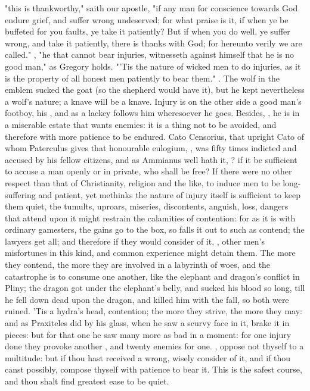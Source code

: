 {"this is thankworthy," saith our apostle, "if any man for conscience towards God endure grief, and suffer wrong undeserved; for what praise is it, if when ye be buffeted for you faults, ye take it patiently? But if when you do well, ye suffer wrong, and take it patiently, there is thanks with God; for hereunto verily we are called." , "he that cannot bear injuries, witnesseth against himself that he is no good man," as Gregory holds. "'Tis the nature of wicked men to do injuries, as it is the property of all honest men patiently to bear them." . The wolf in the emblem sucked the goat (so the shepherd would have it), but he kept nevertheless a wolf's nature; a knave will be a knave. Injury is on the other side a good man's footboy, his , and as a lackey follows him wheresoever he goes. Besides, , he is in a miserable estate that wants enemies: it is a thing not to be avoided, and therefore with more patience to be endured. Cato Censorius, that upright Cato of whom Paterculus gives that honourable eulogium, , was fifty times indicted and accused by his fellow citizens, and as Ammianus well hath it, ? if it be sufficient to accuse a man openly or in private, who shall be free? If there were no other respect than that of Christianity, religion and the like, to induce men to be long-suffering and patient, yet methinks the nature of injury itself is sufficient to keep them quiet, the tumults, uproars, miseries, discontents, anguish, loss, dangers that attend upon it might restrain the calamities of contention: for as it is with ordinary gamesters, the gains go to the box, so falls it out to such as contend; the lawyers get all; and therefore if they would consider of it, , other men's misfortunes in this kind, and common experience might detain them. The more they contend, the more they are involved in a labyrinth of woes, and the catastrophe is to consume one another, like the elephant and dragon's conflict in Pliny; the dragon got under the elephant's belly, and sucked his blood so long, till he fell down dead upon the dragon, and killed him with the fall, so both were ruined. 'Tis a hydra's head, contention; the more they strive, the more they may: and as Praxiteles did by his glass, when he saw a scurvy face in it, brake it in pieces: but for that one he saw many more as bad in a moment: for one injury done they provoke another , and twenty enemies for one. , oppose not thyself to a multitude: but if thou hast received a wrong, wisely consider of it, and if thou canst possibly, compose thyself with patience to bear it. This is the safest course, and thou shalt find greatest ease to be quiet.

}
